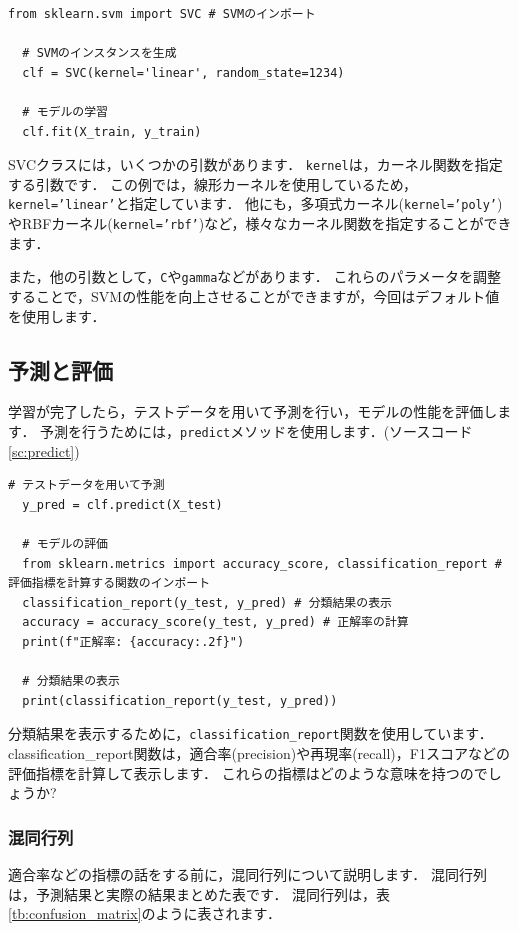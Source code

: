 \documentclass{jarticle}
\begin{document}
\begin{lstlisting}[caption=SVMによる分類, label=sc:svm]
  from sklearn.svm import SVC # SVMのインポート

  # SVMのインスタンスを生成
  clf = SVC(kernel='linear', random_state=1234)

  # モデルの学習
  clf.fit(X_train, y_train)
\end{lstlisting}

SVCクラスには，いくつかの引数があります．
\texttt{kernel}は，カーネル関数を指定する引数です．
この例では，線形カーネルを使用しているため，\texttt{kernel='linear'}と指定しています．
他にも，多項式カーネル(\texttt{kernel='poly'})やRBFカーネル(\texttt{kernel='rbf'})など，様々なカーネル関数を指定することができます．

また，他の引数として，\texttt{C}や\texttt{gamma}などがあります．
これらのパラメータを調整することで，SVMの性能を向上させることができますが，今回はデフォルト値を使用します．

\subsection{予測と評価}
学習が完了したら，テストデータを用いて予測を行い，モデルの性能を評価します．
予測を行うためには，\texttt{predict}メソッドを使用します．(ソースコード\ref{sc:predict})

\begin{lstlisting}[caption=予測と評価, label=sc:predict]
  # テストデータを用いて予測
  y_pred = clf.predict(X_test)

  # モデルの評価
  from sklearn.metrics import accuracy_score, classification_report # 評価指標を計算する関数のインポート
  classification_report(y_test, y_pred) # 分類結果の表示
  accuracy = accuracy_score(y_test, y_pred) # 正解率の計算
  print(f"正解率: {accuracy:.2f}")

  # 分類結果の表示
  print(classification_report(y_test, y_pred))
\end{lstlisting}

分類結果を表示するために，\texttt{classification\_report}関数を使用しています．
classification\_report関数は，適合率(precision)や再現率(recall)，F1スコアなどの評価指標を計算して表示します．
これらの指標はどのような意味を持つのでしょうか?

\subsubsection{混同行列}
適合率などの指標の話をする前に，混同行列について説明します．
混同行列は，予測結果と実際の結果まとめた表です．
混同行列は，表\ref{tb:confusion_matrix}のように表されます．
\end{document}
